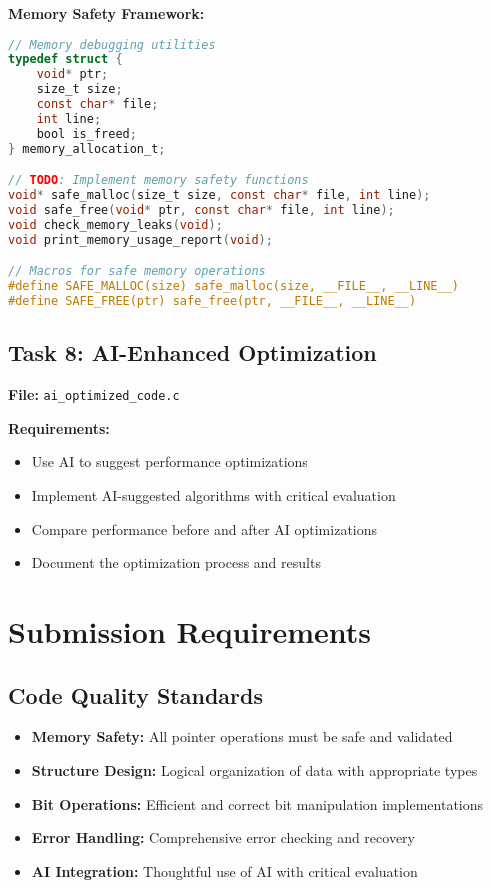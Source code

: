 \documentclass[11pt,a4paper]{article}
\begin{document}
\textbf{Memory Safety Framework:}
\begin{lstlisting}[language=C]
// Memory debugging utilities
typedef struct {
    void* ptr;
    size_t size;
    const char* file;
    int line;
    bool is_freed;
} memory_allocation_t;

// TODO: Implement memory safety functions
void* safe_malloc(size_t size, const char* file, int line);
void safe_free(void* ptr, const char* file, int line);
void check_memory_leaks(void);
void print_memory_usage_report(void);

// Macros for safe memory operations
#define SAFE_MALLOC(size) safe_malloc(size, __FILE__, __LINE__)
#define SAFE_FREE(ptr) safe_free(ptr, __FILE__, __LINE__)
\end{lstlisting}

\subsection{Task 8: AI-Enhanced Optimization}

\textbf{File:} \texttt{ai\_optimized\_code.c}

\textbf{Requirements:}
\begin{itemize}
    \item Use AI to suggest performance optimizations
    \item Implement AI-suggested algorithms with critical evaluation
    \item Compare performance before and after AI optimizations
    \item Document the optimization process and results
\end{itemize}

\section{Submission Requirements}

\subsection{Code Quality Standards}
\begin{itemize}
    \item \textbf{Memory Safety:} All pointer operations must be safe and validated
    \item \textbf{Structure Design:} Logical organization of data with appropriate types
    \item \textbf{Bit Operations:} Efficient and correct bit manipulation implementations
    \item \textbf{Error Handling:} Comprehensive error checking and recovery
    \item \textbf{AI Integration:} Thoughtful use of AI with critical evaluation
\end{itemize}
\end{document}
